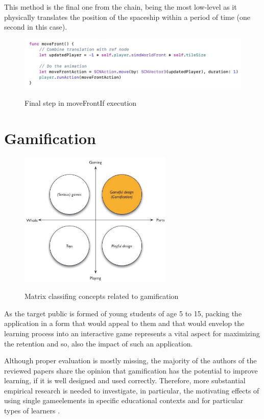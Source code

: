 \documentclass[12 pct]{report}
\begin{document}
This method is the final one from the chain, being the most low-level as it physically translates the position of the spaceship within a period of time (one second in this case).
\begin{figure}[H]
\includegraphics[width=1.0\textwidth]{move-front-if-4}
\centering
\label{fig:feature-points}
\caption{ Final step in moveFrontIf execution}
\end{figure}


\section{Gamification}
\begin{figure}[H]
\includegraphics[width=0.65\textwidth]{gamification}
\centering
\label{fig:feature-points}
\caption{ Matrix classifing concepts related to gamification \cite{deterding2011gamification} }
\end{figure}

As the target public is formed of young students of age 5 to 15, packing the application in a form that would appeal to them and that would envelop the learning process into an interactive game represents a vital aspect for maximizing the retention and so, also the impact of such an application. 

Although proper evaluation is mostly missing, the majority of the authors of the reviewed papers share the opinion that gamification has the potential to improve learning, if it is well designed and used correctly. Therefore, more substantial empirical research is needed to investigate, in particular, the motivating effects of using single gameelements in specific educational contexts and for particular types of learners \cite{dicheva2015gamification}. 
\end{document}
